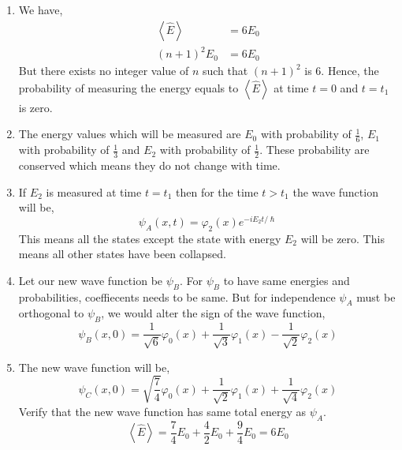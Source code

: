 \documentclass[addpoints]{exam}
\begin{document}
\begin{questions}
\begin{solution}
\begin{enumerate}
            \item We have,
                  \begin{equation*}
                      \begin{aligned}
                          \left<\hat{E}\right> & = 6E_0 \\
                          (n+1)^2E_0           & = 6E_0
                      \end{aligned}
                  \end{equation*}
                  But there exists no integer value of \(n\) such that \((n+1)^2\) is 6. Hence, the probability of measuring the energy equals to \(\left<\hat{E}\right>\) at time \(t=0\) and \(t=t_1\) is zero.
            \item The energy values which will be measured are \(E_0\) with probability of \(\frac{1}{6}\), \(E_1\) with probability of \(\frac{1}{3}\) and \(E_2\) with probability of \(\frac{1}{2}\). These probability are conserved which means they do not change with time.
            \item If \(E_2\) is measured at time \(t=t_1\) then for the time \(t>t_1\) the wave function will be,
                  \[\psi_A(x,t) = \varphi_2(x)e^{-iE_2t/\hslash}\]
                  This means all the states except the state with energy \(E_2\) will be zero. This means all other states have been collapsed.
            \item Let our new wave function be \(\psi_B\). For \(\psi_B\) to have same energies and probabilities, coeffiecents needs to be same. But for independence \(\psi_A\) must be orthogonal to \(\psi_B\), we would alter the sign of the wave function,
                  \[\psi_B(x,0)=\frac{1}{\sqrt{6}}\varphi_0(x)+\frac{1}{\sqrt{3}}\varphi_1(x)-\frac{1}{\sqrt{2}}\varphi_2(x)\]
            \item The new wave function will be,
                  \[\psi_C(x,0)=\sqrt{\frac{7}{4}}\varphi_0(x)+\frac{1}{\sqrt{2}}\varphi_1(x)+\frac{1}{\sqrt{4}}\varphi_2(x)\]
                  Verify that the new wave function has same total energy as \(\psi_A\).
                  \[\left<\hat{E}\right> = \frac{7}{4}E_0+\frac{4}{2}E_0+\frac{9}{4}E_0 = 6E_0\]
        \end{enumerate}
    \end{solution}


\end{questions}
\end{document}
